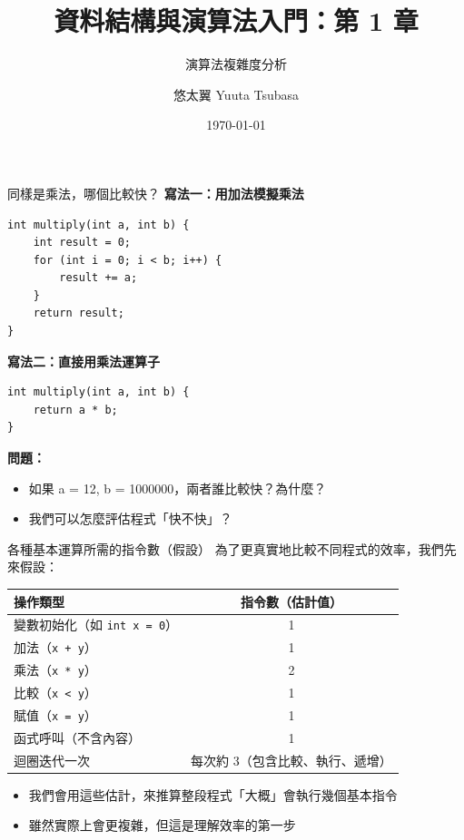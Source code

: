 \documentclass{beamer}
\begin{document}
\title{資料結構與演算法入門：第 1 章}
\subtitle{演算法複雜度分析}
\author{悠太翼 Yuuta Tsubasa}
\date{\today}

\frame{\titlepage}

\begin{frame}[fragile]{同樣是乘法，哪個比較快？}
\textbf{寫法一：用加法模擬乘法}
\begin{lstlisting}[style=cppstyle]
int multiply(int a, int b) {
    int result = 0;
    for (int i = 0; i < b; i++) {
        result += a;
    }
    return result;
}
\end{lstlisting}

\vspace{0.5em}
\textbf{寫法二：直接用乘法運算子}
\begin{lstlisting}[style=cppstyle]
int multiply(int a, int b) {
    return a * b;
}
\end{lstlisting}

\vspace{0.5em}
\textbf{問題：}
\begin{itemize}
    \item 如果 a = 12, b = 1000000，兩者誰比較快？為什麼？
    \item 我們可以怎麼評估程式「快不快」？
\end{itemize}
\end{frame}

\begin{frame}{各種基本運算所需的指令數（假設）}
為了更真實地比較不同程式的效率，我們先來假設：

\begin{center}
\begin{tabular}{|l|c|}
\hline
\textbf{操作類型} & \textbf{指令數（估計值）} \\
\hline
變數初始化（如 \texttt{int x = 0}） & 1 \\
加法（\texttt{x + y}） & 1 \\
乘法（\texttt{x * y}） & 2 \\
比較（\texttt{x < y}） & 1 \\
賦值（\texttt{x = y}） & 1 \\
函式呼叫（不含內容） & 1 \\
迴圈迭代一次 & 每次約 3（包含比較、執行、遞增） \\
\hline
\end{tabular}
\end{center}

\vspace{1em}
\begin{itemize}
    \item 我們會用這些估計，來推算整段程式「大概」會執行幾個基本指令
    \item 雖然實際上會更複雜，但這是理解效率的第一步
\end{itemize}
\end{frame}
\end{document}
